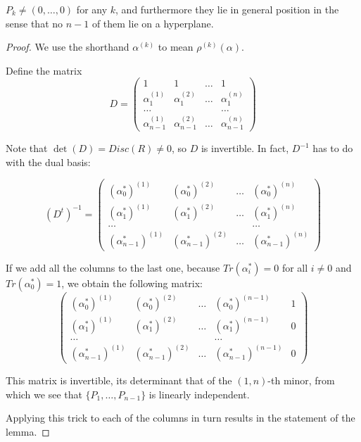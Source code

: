 \documentclass{report}
\begin{document}
\begin{lemma} \label{X_R well-defined}
$P_k \neq (0,\ldots,0)$ for any $k$, and furthermore they lie in general position in the sense that no $n-1$ of them lie on a hyperplane.
\end{lemma}
\begin{proof}
We use the shorthand $\alpha^{(k)}$ to mean $\rho^{(k)}(\alpha)$.

Define the matrix
\begin{equation}
D = \begin{pmatrix}
1 & 1 & \ldots & 1 \\
\alpha_1^{(1)} & \alpha_1^{(2)} & \ldots & \alpha_1^{(n)} \\
\ldots & & & \ldots \\
\alpha_{n-1}^{(1)} & \alpha_{n-1}^{(2)} & \ldots & \alpha_{n-1}^{(n)}
\end{pmatrix}
\end{equation}

Note that $\det(D) = Disc(R) \neq 0$, so $D$ is invertible.  In fact, $D^{-1}$ has to do with the dual basis:

\begin{equation}
(D^t)^{-1} = \begin{pmatrix}
(\alpha_0^*)^{(1)} & (\alpha_0^*)^{(2)} & \ldots & (\alpha_0^*)^{(n)} \\
(\alpha_1^*)^{(1)} & (\alpha_1^*)^{(2)} & \ldots & (\alpha_1^*)^{(n)} \\
\ldots & & & \ldots \\
(\alpha_{n-1}^*)^{(1)} & (\alpha_{n-1}^*)^{(2)} & \ldots & (\alpha_{n-1}^*)^{(n)}
\end{pmatrix}
\end{equation}

If we add all the columns to the last one, because $Tr(\alpha_i^*) = 0$ for all $i \neq 0$ and $Tr(\alpha_0^*) = 1$, we obtain the following matrix:
\begin{equation}
\begin{pmatrix}
(\alpha_0^*)^{(1)} & (\alpha_0^*)^{(2)} & \ldots & (\alpha_0^*)^{(n-1)} & 1 \\
(\alpha_1^*)^{(1)} & (\alpha_1^*)^{(2)} & \ldots & (\alpha_1^*)^{(n-1)} & 0 \\
\ldots & & & \ldots \\
(\alpha_{n-1}^*)^{(1)} & (\alpha_{n-1}^*)^{(2)} & \ldots & (\alpha_{n-1}^*)^{(n-1)} & 0
\end{pmatrix}
\end{equation}

This matrix is invertible, its determinant that of the $(1,n)$-th minor, from which we see that $\{ P_1, \ldots, P_{n-1} \}$ is linearly independent.

Applying this trick to each of the columns in turn results in the statement of the lemma.
\end{proof}
\end{document}

